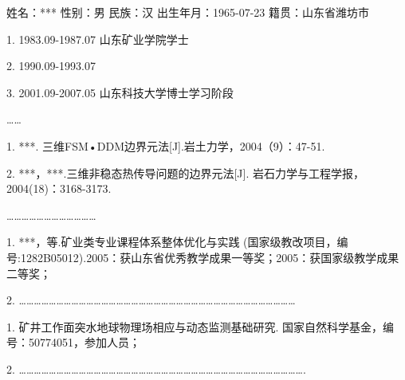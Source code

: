 
\newpage\thispagestyle{empty}
\begin{center}{\bfseries\xiaoer{}}\end{center}
\begin{raggedright}{\bfseries\sihao{}}\end{raggedright}
    
姓名：*** 性别：男 民族：汉 出生年月：1965-07-23 籍贯：山东省潍坊市

1. 1983.09-1987.07   山东矿业学院学士

2. 1990.09-1993.07   

3. 2001.09-2007.05   山东科技大学博士学习阶段

……


\begin{raggedright}{\bfseries\sihao{}}\end{raggedright}

1.  ***. 三维FSM•DDM边界元法[J].岩土力学，2004（9）：47-51.

2.  ***，***.三维非稳态热传导问题的边界元法[J]. 岩石力学与工程学报，2004(18)：3168-3173.

………………………………


\begin{raggedright}{\bfseries\sihao{}}\end{raggedright}

1.  ***，等.矿业类专业课程体系整体优化与实践 (国家级教改项目，编号:1282B05012).2005：获山东省优秀教学成果一等奖；2005：获国家级教学成果二等奖；

2.  …………………………………………………………………………………………………


\begin{raggedright}{\bfseries\sihao{}}\end{raggedright}

1.  矿井工作面突水地球物理场相应与动态监测基础研究. 国家自然科学基金，编号：50774051，参加人员；

2.  …………………………………………………………………………………………………….







\clearpage


